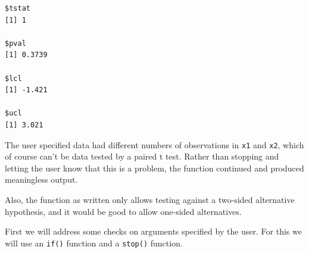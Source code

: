 \documentclass[]{krantz}
\begin{document}
\begin{verbatim}
$tstat
[1] 1

$pval
[1] 0.3739

$lcl
[1] -1.421

$ucl
[1] 3.021
\end{verbatim}

The user specified data had different numbers of observations in
\texttt{x1} and \texttt{x2}, which of course can't be data tested by a
paired t test. Rather than stopping and letting the user know that this
is a problem, the function continued and produced meaningless output.

Also, the function as written only allows testing against a two-sided
alternative hypothesis, and it would be good to allow one-sided
alternatives.

First we will address some checks on arguments specified by the user.
For this we will use an \texttt{if()} function and a \texttt{stop()}
function.
\end{document}
